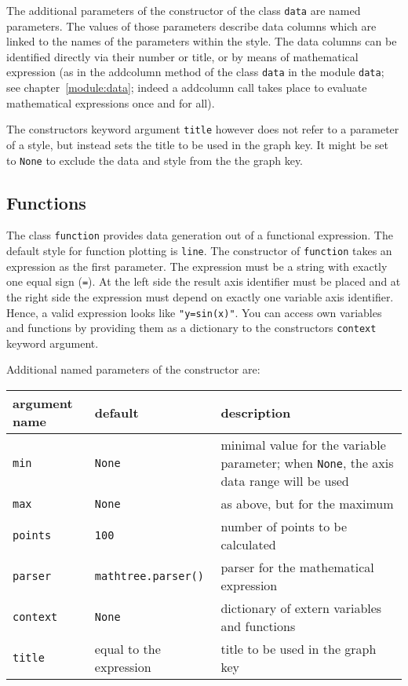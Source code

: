The additional parameters of the constructor of the class \verb|data|
are named parameters. The values of those parameters describe data
columns which are linked to the names of the parameters within the
style. The data columns can be identified directly via their number or
title, or by means of mathematical expression (as in the addcolumn
method of the class \verb|data| in the module \verb|data|; see
chapter~\ref{module:data}; indeed a addcolumn call takes place to
evaluate mathematical expressions once and for all).

The constructors keyword argument \verb|title| however does not
refer to a parameter of a style, but instead sets the title to be used
in the graph key. It might be set to \verb|None| to exclude the data
and style from the the graph key.

\subsection{Functions}

The class \verb|function| provides data generation out of a functional
expression. The default style for function plotting is \verb|line|.
The constructor of \verb|function| takes an expression as the first
parameter. The expression must be a string with exactly one equal sign
(\verb|=|). At the left side the result axis identifier must be placed
and at the right side the expression must depend on exactly one
variable axis identifier. Hence, a valid expression looks like
\verb|"y=sin(x)"|. You can access own variables and functions by
providing them as a dictionary to the constructors \verb|context|
keyword argument.

Additional named parameters of the constructor are:

\medskip
\begin{tabularx}{\linewidth}{ll>{\raggedright\arraybackslash}X}
argument name&default&description\\
\hline
\texttt{min}&\texttt{None}&minimal value for the variable parameter; when \texttt{None}, the axis data range will be used\\
\texttt{max}&\texttt{None}&as above, but for the maximum\\
\texttt{points}&\texttt{100}&number of points to be calculated\\
\texttt{parser}&\texttt{mathtree.parser()}&parser for the mathematical expression\\
\texttt{context}&\texttt{None}&dictionary of extern variables and functions\\
\texttt{title}&equal to the expression&title to be used in the graph key\\
\end{tabularx}
\medskip

